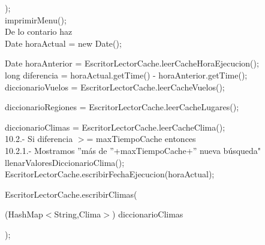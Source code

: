 \documentclass[30pt]{article}
\theoremstyle{definition}
\begin{document}
  \hspace{4cm} );\\
  
  \hspace{4cm} imprimirMenu();\\
  
  \hspace{2cm} De lo contario haz\\
  
  \hspace{2cm} Date horaActual = new Date();
  
  \hspace{2cm} Date horaAnterior = EscritorLectorCache.leerCacheHoraEjecucion();\\

  \hspace{2cm} long diferencia = horaActual.getTime() - horaAnterior.getTime();\\

  \hspace{2cm} diccionarioVuelos = EscritorLectorCache.leerCacheVuelos();
  
  \hspace{2cm} diccionarioRegiones = EscritorLectorCache.leerCacheLugares();
  
  \hspace{2cm} diccionarioClimas = EscritorLectorCache.leerCacheClima();\\
  
  \hspace{2cm} 10.2.- Si diferencia $>$= maxTiempoCache entonces\\
  
  \hspace{3cm} 10.2.1.- Mostramos ''más de ''+maxTiempoCache+'' nueva búsqueda"\\
  
  \hspace{3cm} llenarValoresDiccionarioClima();\\
  
  \hspace{3cm} EscritorLectorCache.escribirFechaEjecucion(horaActual);
  
  \hspace{3cm} EscritorLectorCache.escribirClimas(
  
  \hspace{4cm} (HashMap$<$String,Clima$>$) diccionarioClimas
  
  \hspace{3cm} );\\
  
\end{document}
